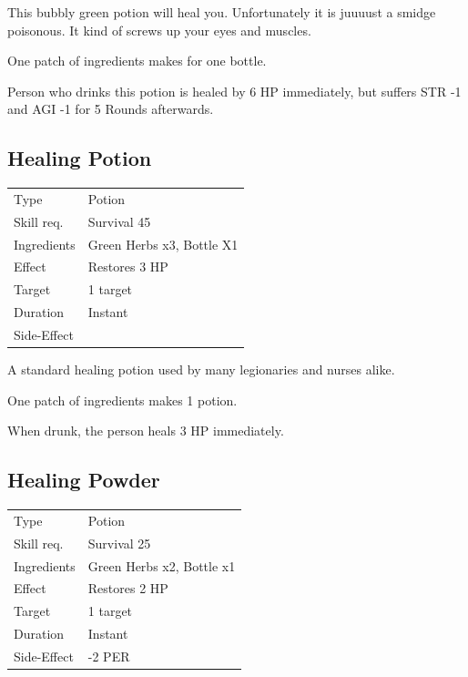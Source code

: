 \documentclass[11pt,a4paper,twocolumn]{book}
\begin{document}
\medskip

This bubbly green potion will heal you. Unfortunately it is juuuust a smidge poisonous. It kind of screws up your eyes and muscles.

One patch of ingredients makes for one bottle.

Person who drinks this potion is healed by 6 HP immediately, but suffers STR -1 and AGI -1 for 5 Rounds afterwards.


\subsection*{Healing Potion}
{
	\begin{tabu} to 75mm{| X[l,4] | X[l,8] |}
		\hline
		Type 			& Potion 						\\
        Skill req.	    & Survival 45 					\\
        Ingredients     & Green Herbs x3, Bottle X1		\\
        Effect     		& Restores 3 HP 				\\
        Target      	& 1 target						\\
        Duration  		& Instant	 					\\
        Side-Effect     & 								\\ \hline
	\end{tabu}
		
}

\medskip

A standard healing potion used by many legionaries and nurses alike.

One patch of ingredients makes 1 potion.

When drunk, the person heals 3 HP immediately.

\vfill

\subsection*{Healing Powder}
{
	\begin{tabu} to 75mm{| X[l,4] | X[l,8] |}
		\hline
		Type 			& Potion 								\\
        Skill req.	    & Survival 25 							\\
        Ingredients     & Green Herbs x2, Bottle x1				\\
        Effect     		& Restores 2 HP 						\\
        Target      	& 1 target								\\
        Duration  		& Instant	 							\\
        Side-Effect     & -2 PER								\\ \hline
	\end{tabu}
		
}
\end{document}
